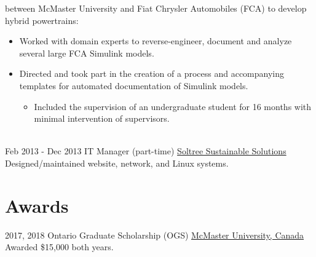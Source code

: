 \documentclass[letterpaper]{twentysecondcv} %
\begin{document}
\begin{twenty}
{    between McMaster University and Fiat Chrysler Automobiles (FCA) to develop
    hybrid powertrains:
    \begin{itemize}
			\item Worked with domain experts to reverse-engineer, document and analyze several large FCA Simulink models.
			\item Directed and took part in the creation of a process and accompanying templates for automated documentation of Simulink models.
      \begin{itemize}
        \item Included the supervision of an undergraduate student for 16 months with minimal intervention of supervisors.
      \end{itemize}
	\end{itemize}}
	\\
	\twentyitem
	{Feb 2013 -}
	{Dec 2013}
	{IT Manager (part-time)}
	{\href{http://www.soltree.net/}{Soltree Sustainable Solutions}}
	{}
  {Designed/maintained website, network, and Linux systems.}
\end{twenty} 
\section{Awards}

\begin{twenty}
  \twentyitem
  {2017,}
  {2018}
  {Ontario Graduate Scholarship (OGS)}
	{\href{https://www.mcmaster.ca/}{McMaster University, Canada}}
	{}
	{Awarded \$15,000 both years.}
\end{twenty}
\end{document}
